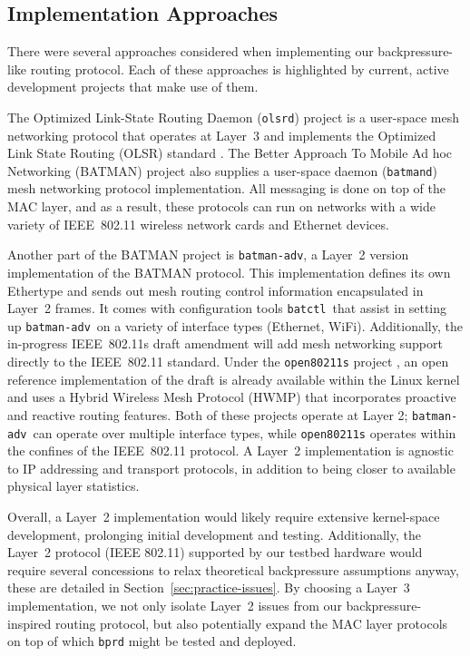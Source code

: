 \documentclass{article}
\newcommand{\batctl}{\texttt{batctl}}
\newcommand{\batmanadv}{\texttt{batman-adv}}
\newcommand{\batmand}{\texttt{batmand}}
\newcommand{\bprd}{\texttt{bprd}\xspace}
\newcommand{\olsrd}{\texttt{olsrd}}
\begin{document}
\subsection{Implementation Approaches}\label{sec:rel-work-impl-approaches}

There were several approaches considered when implementing our backpressure-like routing protocol.
Each of these approaches is highlighted by current, active development projects that make use of them.


The Optimized Link-State Routing Daemon (\olsrd) \cite{olsrd} project is a user-space mesh networking protocol that operates at Layer~3 and implements the Optimized Link State Routing (OLSR) standard \cite{olsr-rfc}.
The Better Approach To Mobile Ad hoc Networking (BATMAN) \cite{batman} project also supplies a user-space daemon (\batmand) mesh networking protocol implementation.
All messaging is done on top of the MAC layer, and as a result, these protocols can run on networks with a wide variety of IEEE~802.11 wireless network cards and Ethernet devices.


Another part of the BATMAN project is \batmanadv, a Layer~2 version implementation of the BATMAN protocol.
This implementation defines its own Ethertype and sends out mesh routing control information encapsulated in Layer~2 frames.
It comes with configuration tools \batctl\ that assist in setting up \batmanadv\ on a variety of interface types (Ethernet, WiFi).
Additionally, the in-progress IEEE~802.11s draft amendment will add mesh networking support directly to the IEEE~802.11 standard.
Under the \texttt{open80211s} project \cite{open80211s}, an open reference implementation of the draft is already available within the Linux kernel and uses a Hybrid Wireless Mesh Protocol (HWMP) that incorporates proactive and reactive routing features.
Both of these projects operate at Layer 2; \batmanadv\ can operate over multiple interface types, while \texttt{open80211s} operates within the confines of the IEEE~802.11 protocol.
A Layer~2 implementation is agnostic to IP addressing and transport protocols, in addition to being closer to available physical layer statistics.


Overall, a Layer~2 implementation would likely require extensive kernel-space development, prolonging initial development and testing.
Additionally, the Layer~2 protocol (IEEE 802.11) supported by our testbed hardware would require several concessions to relax theoretical backpressure assumptions anyway, these are detailed in Section~\ref{sec:practice-issues}.
By choosing a Layer~3 implementation, we not only isolate Layer~2 issues from our backpressure-inspired routing protocol, but also potentially expand the MAC layer protocols on top of which \bprd might be tested and deployed.
\end{document}
